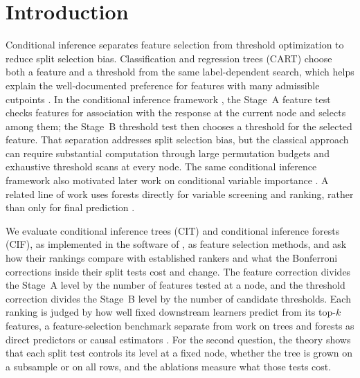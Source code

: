 \section{Introduction}
\label{sec:introduction}

Conditional inference separates feature selection from threshold optimization to
reduce split selection bias. Classification and regression trees (CART) choose
both a feature and a threshold from the same label-dependent search, which helps
explain the well-documented preference for features with many admissible
cutpoints
\citep{Breiman1984ClassificationAndRegressionTrees,LohShih1997SplitSelectionMethods,KimLoh2001ClassificationTreesUnbiasedMultiwaySplits,Loh2002RegressionTreesUnbiasedVariableSelectionInteractionDetection,Shih2004NoteOnSplitSelectionBiasClassificationTrees,StroblBoulesteixAugustin2007UnbiasedSplitSelectionGini,Strobl2007BiasRFVariableImportance}.
In the conditional inference framework \citep{Hothorn2006UnbiasedRecursivePartitioning,HothornHornikVandeWielZeileis2006LegoSystemConditionalInference},
the Stage~A feature test checks features for association with the response at
the current node and selects among them; the Stage~B threshold test then
chooses a threshold for the selected feature. That separation addresses split
selection bias, but the classical approach can require substantial computation
through large permutation budgets and exhaustive threshold scans at every node.
The same conditional inference framework also motivated later work on
conditional variable importance \citep{Strobl2008ConditionalVIM}.
A related line of work uses forests directly for variable screening and ranking,
rather than only for final prediction
\citep{GenuerPoggiTuleauMalot2010VariableSelectionUsingRandomForests}.

We evaluate conditional inference trees (CIT) and conditional inference
forests (CIF), as implemented in the software of
\citet{MilletichDownesHirst2026citrees}, as feature selection methods, and ask
how their rankings compare with established rankers and what the Bonferroni
corrections inside their split tests cost and change. The feature correction
divides the Stage~A level by the number of features tested at a node, and the
threshold correction divides the Stage~B level by the number of candidate
thresholds. Each ranking is judged by how well fixed downstream learners
predict from its top-$k$ features, a feature-selection benchmark separate from
work on trees and forests as direct predictors or causal estimators
\citep{Breiman2001RandomForests,WagerAthey2018CausalForests,AtheyTibshiraniWager2019GeneralizedRandomForests}.
For the second question, the theory shows that each split test controls its
level at a fixed node, whether the tree is grown on a subsample or on all
rows, and the ablations measure what those tests cost.

